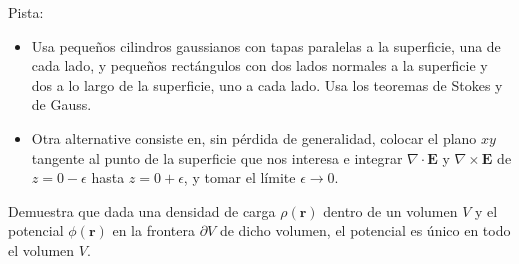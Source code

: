 \documentclass{exam}
\begin{document}
\begin{questions}
Pista:
\begin{itemize}
\item Usa pequeños cilindros gaussianos con tapas paralelas a la superficie,
una de cada lado, y pequeños rectángulos con dos lados normales a la
superficie y dos a lo largo de la superficie, uno a cada lado. Usa los
teoremas de Stokes y de Gauss.
\item Otra alternative consiste en, sin pérdida de generalidad,
  colocar el plano $xy$ tangente al punto de la superficie que nos
  interesa e integrar $\nabla\cdot\bm E$ y $\nabla\times\bm E$ de
  $z=0-\epsilon$ hasta $z=0+\epsilon$, y tomar el límite
  $\epsilon\to0$.
\end{itemize}
\question
{}
\question Demuestra que dada una densidad de carga $\rho(\bm r)$
dentro de un volumen $V$ y el potencial $\phi(\bm r)$ en la frontera
$\partial V$ de dicho volumen, el potencial es único en todo el
volumen $V$.


\end{questions}
\end{document}
